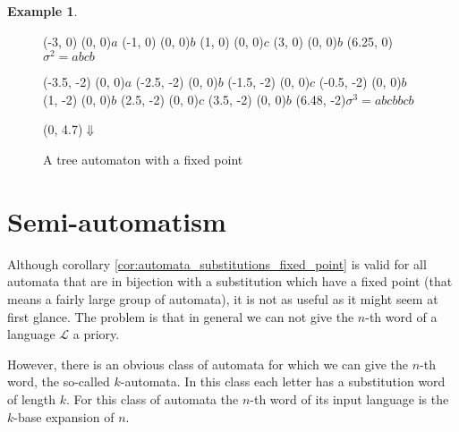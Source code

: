 \documentclass{article}
\theoremstyle{definition}
\newtheorem{example}[theorem]{Example}
\begin{document}
\begin{example}
\begin{figure}[t]
\begin{graph}
  (-3, 0)  (0, 0){$a$} %
  (-1, 0)  (0, 0){$b$}
  (1, 0)  (0, 0){$c$}
  (3, 0)  (0, 0){$b$}
  \freetext(6.25, 0){$\sigma^2 = abcb$}

  (-3.5, -2)  (0, 0){$a$} %
  (-2.5, -2)  (0, 0){$b$}
  (-1.5, -2) (0, 0){$c$}
  (-0.5, -2)  (0, 0){$b$}
  (1, -2)  (0, 0){$b$}
  (2.5, -2)  (0, 0){$c$}
  (3.5, -2)  (0, 0){$b$}
  \freetext(6.48, -2){$\sigma^3 = abcbbcb$}

   
   
  
   
   
   
   

   
   
   
   
   
   
   

  \freetext(0, 4.7){$\Downarrow$}
\end{graph}
\caption{A tree automaton with a fixed point}
\label{fig:automata_tree_fixpoint_substitutions}
\end{figure}
\end{example}

\section{Semi-automatism}
Although corollary \ref{cor:automata_substitutions_fixed_point} is valid for 
all automata that are in bijection with a substitution which have a fixed point
(that means a fairly large group of automata), it is not as useful as it might 
seem at first glance. The problem is that in general we can not give the $n$-th
word of a language $\mathcal{L}$ a priory.

However, there is an obvious class of automata for which we can give the $n$-th
word, the so-called $k$-automata. In this class each letter has a substitution
word of length $k$. For this class of automata the $n$-th word of its input 
language is the $k$-base expansion of $n$.
\end{document}
